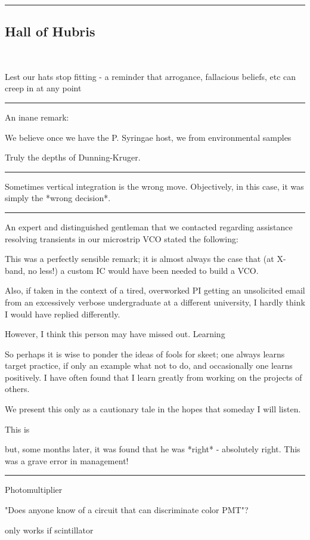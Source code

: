 \documentclass[paper.tex]{subfiles}
\begin{document}
\rule{\linewidth}{0.2pt}

\subsection{Hall of Hubris} \

Lest our hats stop fitting - a reminder that arrogance, fallacious beliefs, etc can creep in at any point

\rule{\linewidth}{0.2pt}

An inane remark:

\begin{displayquote}
We believe once we have the P. Syringae host, we from environmental samples
\end{displayquote}

Truly the depths of Dunning-Kruger.




\rule{\linewidth}{0.2pt}

Sometimes vertical integration is the wrong move. Objectively, in this case, it was simply the *wrong decision*. 

\rule{\linewidth}{0.2pt}


An expert and distinguished gentleman that we contacted regarding assistance resolving transients in our microstrip VCO stated the following:



This was a perfectly sensible remark; it is almost always the case that (at X-band, no less!) a custom IC would have been needed to build a VCO.

Also, if taken in the context of a tired, overworked PI getting an unsolicited email from an excessively verbose undergraduate at a different university, I hardly think I would have replied differently.

However, I think this person may have missed out. Learning 

So perhaps it is wise to ponder the ideas of fools for skeet; one always learns target practice, if only an example what not to do, and occasionally one learns positively. I have often found that I learn greatly from working on the projects of others.

We present this only as a cautionary tale in the hopes that someday I will listen.

 This is 

but, some months later, it was found that he was *right* - absolutely right. This was a grave error in management!

\rule{\linewidth}{0.2pt}

Photomultiplier

"Does anyone know of a circuit that can discriminate color PMT"?

only works if scintillator


\end{document}
